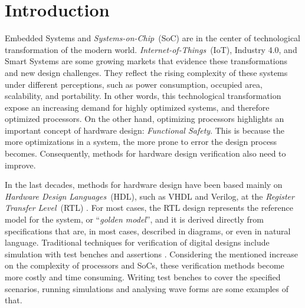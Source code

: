 \chapter{Introduction}

Embedded Systems and \textit{Systems-on-Chip}~(SoC) are in the center of technological transformation of the modern world. \textit {Internet-of-Things}~(IoT), Industry 4.0, and Smart Systems are some growing markets that evidence these transformations and new design challenges. They reflect the rising complexity of these systems under different perceptions, such as power consumption, occupied area, scalability, and portability. In other words, this technological transformation expose an increasing demand for highly optimized systems, and therefore optimized processors. On the other hand, optimizing processors highlights an important concept of hardware design: \textit{Functional Safety}. This is because the more optimizations in a system, the more prone to error the design process becomes. Consequently, methods for hardware design verification also need to improve.

In the last decades, methods for hardware design have been based mainly on \textit{Hardware Design Languages}~(HDL), such as VHDL and Verilog, at the \textit{Register Transfer Level}~(RTL) \cite{paper-pdd}. For most cases, the RTL design represents the reference model for the system, or “\textit{golden model}”, and it is derived directly from specifications that are, in most cases, described in diagrams, or even in natural language. Traditional techniques for verification of digital designs include simulation with test benches and assertions \cite{paper-symbolic}. Considering the mentioned increase on the complexity of processors and SoCs, these verification methods become more costly and time consuming. Writing test benches to cover the specified scenarios, running simulations and analysing wave forms are some examples of that.   

